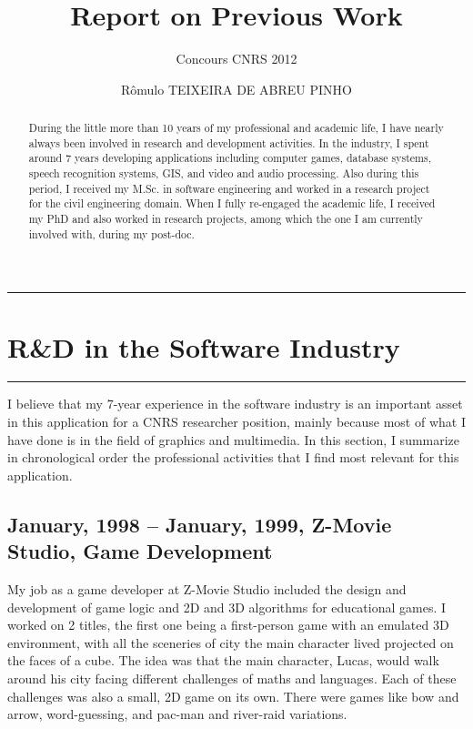 \documentclass[a4paper]{article}
\title{Report on Previous Work}
\author{Concours CNRS 2012}
\date{R\^omulo TEIXEIRA DE ABREU PINHO}
\begin{document}
\maketitle

\begin{abstract}
During the little more than 10 years of my professional and academic life, I have nearly always been involved in research and development activities. In the industry, I spent around 7 years developing applications including computer games, database systems, speech recognition systems, GIS, and video and audio processing. Also during this period, I received my M.Sc. in software engineering and worked in a research project for the civil engineering domain. When I fully re-engaged the academic life, I received my PhD and also worked in research projects, among which the one I am currently involved with, during my post-doc. 

\end{abstract}

\tableofcontents

\medskip
\medskip

\hrule
\section{R{\&}D in the Software Industry}
\hrule

\medskip
\medskip

I believe that my 7-year experience in the software industry is an important asset in this application for a CNRS researcher position, mainly because most of what I have done is in the field of graphics and multimedia. In this section, I summarize in chronological order the professional activities that I find most relevant for this application. 

\subsection{January, 1998 -- January, 1999, Z-Movie Studio, Game Development}

My job as a game developer at Z-Movie Studio included the design and development of game logic and 2D and 3D algorithms for educational games. I worked on 2 titles, the first one being a first-person game with an emulated 3D environment, with all the sceneries of city the main character lived projected on the faces of a cube. The idea was that the main character, Lucas, would walk around his city facing different challenges of maths and languages. Each of these challenges was also a small, 2D game on its own. There were games like bow and arrow, word-guessing, and pac-man and river-raid variations. 
\end{document}
